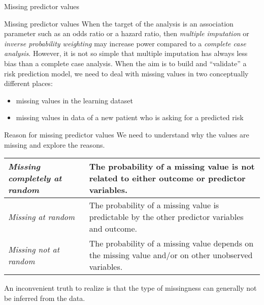 \documentclass{beamer}\usepackage{listings}
\begin{document}
\begin{frame}[label={sec:org63aafe4}]{}
\huge \color{white}
Missing predictor values
\end{frame}
\begin{frame}[label={sec:orgddd4a91}]{Missing predictor values}
When the target of the analysis is an association parameter such as an
odds ratio or a hazard ratio, then \emph{multiple imputation} or \emph{inverse
probability weighting} may increase power compared to a \emph{complete case
analysis}.
\vfill
However, it is not so simple that multiple imputation has always less bias 
than a complete case analysis.
\vfill
When the aim is to build and ``validate'' a risk prediction model, we need to
deal with missing values in two conceptually different places: 

\begin{itemize}
\item missing values in the learning dataset
\item missing values in data of a new patient who is asking for a predicted risk
\end{itemize}
\end{frame}
\begin{frame}[label={sec:orgb0a4176}]{Reason for missing predictor values}
We need to understand \alert{why} the values are missing and explore the reasons.

\begin{center}
\begin{tabular}{m{3cm}m{8cm}}
\hline
\emph{Missing completely at random} & The probability of a missing value is not related to either outcome or predictor variables.\\
\hline
\emph{Missing at random} & The probability of a missing value is predictable by the other predictor variables \alert{and outcome}.\\
\hline
\emph{Missing not at random} & The probability of a missing value depends on the missing value and/or on other unobserved variables.\\
\hline
\end{tabular}
\end{center}

An inconvenient truth to realize is that the type of missingness can
generally not be inferred from the data. 
\end{frame}
\end{document}
